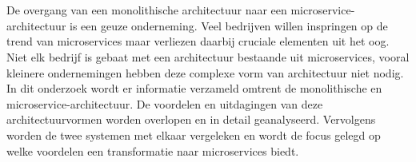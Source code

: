 
%
%

%



\chapter*{}

De overgang van een monolithische architectuur naar een microservice-architectuur is een geuze onderneming. Veel bedrijven willen inspringen op de trend van microservices maar verliezen daarbij cruciale elementen uit het oog. Niet elk bedrijf is gebaat met een architectuur bestaande uit microservices, vooral kleinere ondernemingen hebben deze complexe vorm van architectuur niet nodig.
In dit onderzoek wordt er informatie verzameld omtrent de monolithische en microservice-architectuur. De voordelen en uitdagingen van deze architectuurvormen worden overlopen en in detail geanalyseerd. Vervolgens worden de twee systemen met elkaar vergeleken en wordt de focus gelegd op welke voordelen een transformatie naar microservices biedt. 

